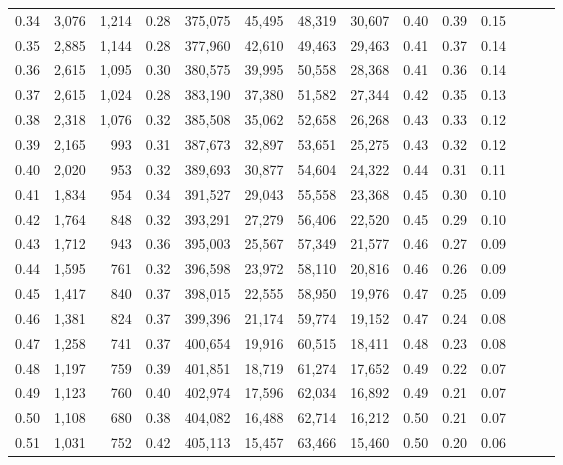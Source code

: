 \begin{tabular}{rrrrrrrrrrrrrr}
0.34 &   3,076 &  1,214 &  0.28 &  375,075 &   45,495 &  48,319 &  30,607 &  0.40 &  0.39 &      0.15 \\
0.35 &   2,885 &  1,144 &  0.28 &  377,960 &   42,610 &  49,463 &  29,463 &  0.41 &  0.37 &      0.14 \\
0.36 &   2,615 &  1,095 &  0.30 &  380,575 &   39,995 &  50,558 &  28,368 &  0.41 &  0.36 &      0.14 \\
0.37 &   2,615 &  1,024 &  0.28 &  383,190 &   37,380 &  51,582 &  27,344 &  0.42 &  0.35 &      0.13 \\
0.38 &   2,318 &  1,076 &  0.32 &  385,508 &   35,062 &  52,658 &  26,268 &  0.43 &  0.33 &      0.12 \\
0.39 &   2,165 &    993 &  0.31 &  387,673 &   32,897 &  53,651 &  25,275 &  0.43 &  0.32 &      0.12 \\
0.40 &   2,020 &    953 &  0.32 &  389,693 &   30,877 &  54,604 &  24,322 &  0.44 &  0.31 &      0.11 \\
0.41 &   1,834 &    954 &  0.34 &  391,527 &   29,043 &  55,558 &  23,368 &  0.45 &  0.30 &      0.10 \\
0.42 &   1,764 &    848 &  0.32 &  393,291 &   27,279 &  56,406 &  22,520 &  0.45 &  0.29 &      0.10 \\
0.43 &   1,712 &    943 &  0.36 &  395,003 &   25,567 &  57,349 &  21,577 &  0.46 &  0.27 &      0.09 \\
0.44 &   1,595 &    761 &  0.32 &  396,598 &   23,972 &  58,110 &  20,816 &  0.46 &  0.26 &      0.09 \\
0.45 &   1,417 &    840 &  0.37 &  398,015 &   22,555 &  58,950 &  19,976 &  0.47 &  0.25 &      0.09 \\
0.46 &   1,381 &    824 &  0.37 &  399,396 &   21,174 &  59,774 &  19,152 &  0.47 &  0.24 &      0.08 \\
0.47 &   1,258 &    741 &  0.37 &  400,654 &   19,916 &  60,515 &  18,411 &  0.48 &  0.23 &      0.08 \\
0.48 &   1,197 &    759 &  0.39 &  401,851 &   18,719 &  61,274 &  17,652 &  0.49 &  0.22 &      0.07 \\
0.49 &   1,123 &    760 &  0.40 &  402,974 &   17,596 &  62,034 &  16,892 &  0.49 &  0.21 &      0.07 \\
0.50 &   1,108 &    680 &  0.38 &  404,082 &   16,488 &  62,714 &  16,212 &  0.50 &  0.21 &      0.07 \\
0.51 &   1,031 &    752 &  0.42 &  405,113 &   15,457 &  63,466 &  15,460 &  0.50 &  0.20 &      0.06 \\

\end{tabular}

